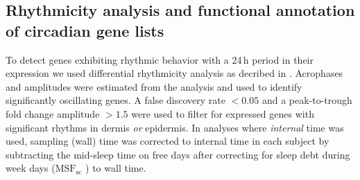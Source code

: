 \subsection*{Rhythmicity analysis and functional annotation of circadian gene lists}
To detect genes exhibiting rhythmic behavior with a 24\,h period in their expression we used differential rhythmicity analysis as decribed in \cite{Pelikan2021}. Acrophases and amplitudes were estimated from the analysis and used to identify significantly oscillating genes. A false discovery rate $<0.05$ and a peak-to-trough fold change amplitude $>1.5$ were used to filter for expressed genes with significant rhythms in dermis \textit{or} epidermis. In analyses where \textit{internal} time was used, sampling (wall) time was corrected to internal time in each subject by subtracting the mid-sleep time on free days after correcting for sleep debt during week days ($\textrm{MSF}_\textrm{sc}$ \cite{Vetter2021}) to wall time. %

